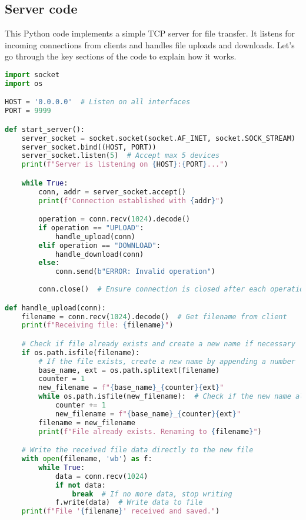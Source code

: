 \documentclass{article}
\begin{document}
\subsection{Server code}
This Python code implements a simple TCP server for file transfer. It listens for incoming connections from clients and handles file uploads and downloads. Let's go through the key sections of the code to explain how it works.

\begin{lstlisting}[language=Python, caption=Server code for file transfer using TCP/IP]
import socket
import os

HOST = '0.0.0.0'  # Listen on all interfaces
PORT = 9999    

def start_server():
    server_socket = socket.socket(socket.AF_INET, socket.SOCK_STREAM)
    server_socket.bind((HOST, PORT))
    server_socket.listen(5)  # Accept max 5 devices
    print(f"Server is listening on {HOST}:{PORT}...")

    while True:
        conn, addr = server_socket.accept()
        print(f"Connection established with {addr}")

        operation = conn.recv(1024).decode()
        if operation == "UPLOAD":
            handle_upload(conn) 
        elif operation == "DOWNLOAD":
            handle_download(conn) 
        else:
            conn.send(b"ERROR: Invalid operation")  
        
        conn.close()  # Ensure connection is closed after each operation

def handle_upload(conn):
    filename = conn.recv(1024).decode()  # Get filename from client
    print(f"Receiving file: {filename}")

    # Check if file already exists and create a new name if necessary
    if os.path.isfile(filename):
        # If the file exists, create a new name by appending a number
        base_name, ext = os.path.splitext(filename)
        counter = 1
        new_filename = f"{base_name}_{counter}{ext}"
        while os.path.isfile(new_filename):  # Check if the new name already exists
            counter += 1
            new_filename = f"{base_name}_{counter}{ext}"
        filename = new_filename
        print(f"File already exists. Renaming to {filename}")

    # Write the received file data directly to the new file
    with open(filename, 'wb') as f:
        while True:
            data = conn.recv(1024)
            if not data:
                break  # If no more data, stop writing
            f.write(data)  # Write data to file
    print(f"File '{filename}' received and saved.")


\end{lstlisting}
\end{document}
